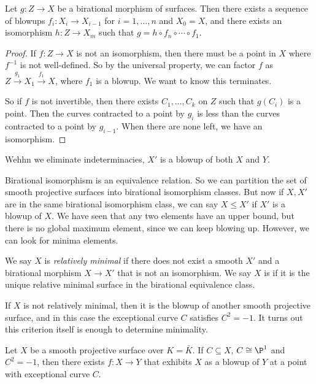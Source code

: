 \documentclass[a4paper]{article}
\begin{document}
\begin{thm}
  Let $g: Z \to X$ be a birational morphism of surfaces. Then there exists a sequence of blowups $f_i: X_i \to X_{i - 1}$ for $i = 1, \ldots, n$ and $X_0 = X$, and there exists an isomorphism $h: Z \to X_m$ such that $g = h \circ f_n \circ \cdots \circ f_1$.
\end{thm}

\begin{proof}
  If $f: Z \to X$ is not an isomorphism, then there must be a point in $X$ where $f^{-1}$ is not well-defined. So by the universal property, we can factor $f$ as $Z \overset{g_1}{\to} X_1 \overset{f_1}{\to} X$, where $f_1$ is a blowup. We want to know this terminates.

  So if $f$ is not invertible, then there exists $C_1, \ldots, C_k$ on $Z$ such that $g(C_i)$ is a point. Then the curves contracted to a point by $g_i$ is less than the curves contracted to a point by $g_{i - 1}$. When there are none left, we have an isomorphism.
\end{proof}

\begin{cor}
  Wehhn we eliminate indeterminacies, $X'$ is a blowup of both $X$ and $Y$.
\end{cor}

Birational isomorphism is an equivalence relation. So we can partition the set of smooth projective surfaces into birational isomorphism classes. But now if $X, X'$ are in the same birational isomorphism class, we can say $X \leq X'$ if $X'$ is a blowup of $X$. We have seen that any two elements have an upper bound, but there is no global maximum element, since we can keep blowing up. However, we can look for minima elements.
\begin{defi}
  We say $X$ is \emph{relatively minimal} if there does not exist a smooth $X'$ and a birational morphism $X \to X'$ that is not an isomorphism. We say $X$ is  if it is the unique relative minimal surface in the birational equivalence class.
\end{defi}

If $X$ is not relatively minimal, then it is the blowup of another smooth projective surface, and in this case the exceptional curve $C$ satisfies $C^2 = -1$. It turns out this criterion itself is enough to determine minimality.
\begin{thm}
  Let $X$ be a smooth projective surface over $K = \bar{K}$. If $C \subseteq X$, $C \cong \P^1$ and $C^2 = -1$, then there exists $f: X \to Y$ that exhibits $X$ as a blowup of $Y$ at a point with exceptional curve $C$.
\end{thm}
\end{document}
